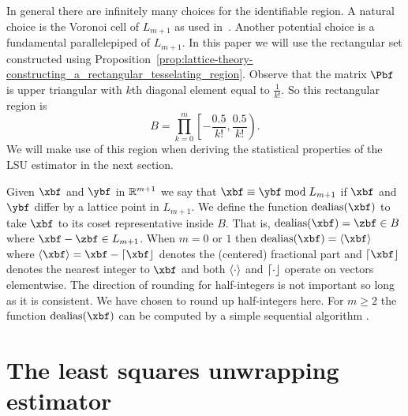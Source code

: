 \documentclass[journal]{IEEEtran}
\begin{document}
In general there are infinitely many choices for the identifiable region. A natural choice is the Voronoi cell of $L_{m+1}$ as used in~\cite{McKilliam2009IndentifiabliltyAliasingPolyphase}. Another potential choice is a fundamental parallelepiped of $L_{m+1}$. In this paper we will use the rectangular set constructed using Proposition~\ref{prop:lattice-theory-constructing_a_rectangular_tesselating_region}. Observe that the matrix $\Pbf$ is upper triangular with $k$th diagonal element equal to $\tfrac{1}{k!}$.  So this rectangular region is
\begin{equation}\label{eq:rectangular_identifiable_region}
B = \prod_{k=0}^{m}\left[ -\frac{0.5}{k!}, \frac{0.5}{k!}  \right).
\end{equation}
We will make use of this region when deriving the statistical properties of the LSU estimator in the next section. 

Given $\xbf$ and $\ybf$ in ${\mathbb R}^{m+1}$ we say that $\xbf \equiv \ybf \bmod L_{m+1}$ if $\xbf$ and $\ybf$ differ by a lattice point in $L_{m+1}$.  We define the function $\dealias(\xbf)$ to take $\xbf$ to its coset representative inside $B$. That is, $\dealias(\xbf) = \zbf \in B$ where $\xbf - \zbf \in L_{m+1}$.  %
When $m = 0$ or $1$ then $\dealias(\xbf) = \fracpart{\xbf}$ where $\fracpart{\xbf} = \xbf - \round{\xbf}$ denotes the (centered) fractional part and $\round{\xbf}$ denotes the nearest integer to $\xbf$ and both $\left\langle \cdot \right\rangle$ and ${\left\lceil \cdot \right\rfloor}$ operate on vectors elementwise.  The direction of rounding for half-integers is not important so long as it is consistent.  We have chosen to round up half-integers here.  For $m \geq 2$ the function $\dealias(\xbf)$ can be computed by a simple sequential algorithm \cite[Sec. 7.2.1]{McKilliam2010thesis}.

\section{The least squares unwrapping estimator}\label{sec:least-squar-unwr}
\end{document}
